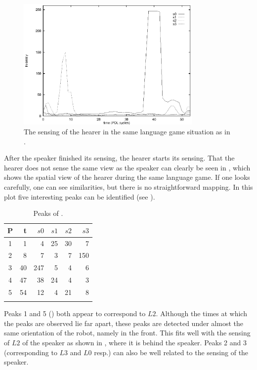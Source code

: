 \begin{figure}
\centerline{\includegraphics[width=9cm]{lang_games/perception2.eps}}
\caption{The sensing of the hearer in the same language game situation as in .}
\label{f:perception2}
\end{figure}


After the speaker finished its sensing, the hearer starts its sensing. That the hearer does not sense the same view as the speaker can clearly be seen in , which shows the spatial view of the hearer during the same language game. If one looks carefully, one can see similarities, but there is no straightforward mapping. In this plot five interesting peaks can be identified (see ).

\begin{table}
\centering
\begin{tabular}{crrrrr}
\lsptoprule
P & t & $s0$ & $s1$ & $s2$ & $s3$\\
\midrule
1 & 1 & 4 & 25 & 30 & 7\\
2 & 8 & 7 & 3 & 7 & 150\\
3 & 40 & 247 & 5 & 4 & 6\\
4 & 47 & 38 & 24 & 4 & 3\\
5 & 54 & 12 & 4 & 21 & 8\\
\lspbottomrule
\end{tabular}
\caption{Peaks of .}
\label{t:perception2}
\end{table}

Peaks 1 and 5 () both appear to correspond to $L2$. Although the times at which the peaks are observed lie far apart, these peaks are detected under almost the same orientation of the robot, namely in the front. This fits well with the sensing of $L2$ of the speaker as shown in , where it is behind the speaker. Peaks 2 and 3 (corresponding to $L3$ and $L0$ resp.) can also be well related to the sensing of the speaker. 

